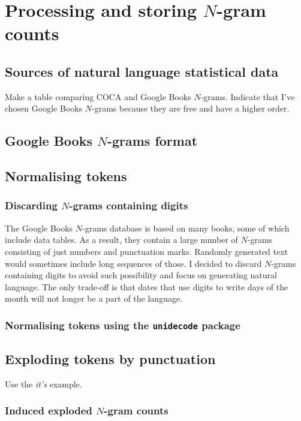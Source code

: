 \documentclass{IIBproject}
\begin{document}
\section{Processing and storing $N$-gram counts}

\subsection{Sources of natural language statistical data}

Make a table comparing COCA and Google Books $N$-grams. Indicate that I've chosen Google Books $N$-grams because they are free and have a higher order.

\subsection{Google Books $N$-grams format}

\subsection{Normalising tokens}

\subsubsection{Discarding $N$-grams containing digits}

The Google Books $N$-grams database is based on many books, some of which include data tables. As a result, they contain a large number of $N$-grams consisting of just numbers and punctuation marks. Randomly generated text would sometimes include long sequences of those. I decided to discard $N$-grams containing digits to avoid such possibility and focus on generating natural language. The only trade-off is that dates that use digits to write days of the month will not longer be a part of the language.

\subsubsection{Normalising tokens using the \texttt{unidecode} package}

\subsection{Exploding tokens by punctuation}

Use the \emph{it's} example.

\subsubsection{Induced exploded $N$-gram counts}
\end{document}
